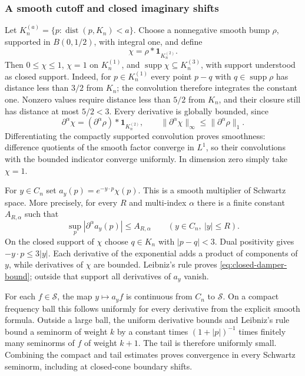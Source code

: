 \subsubsection{A smooth cutoff and closed imaginary shifts}
Let $K_n^{(a)}=\{p:\operatorname{dist}(p,K_n)<a\}$.
Choose a nonnegative smooth bump $\rho$, supported in $B(0,1/2)$,
with integral one, and define
\[
 \chi=\rho*\mathbf1_{K_n^{(2)}}.
\]
Then $0\leq\chi\leq1$, $\chi=1$ on $K_n^{(1)}$, and
$\operatorname{supp}\chi\subseteq K_n^{(3)}$, with support understood
as closed support. Indeed, for $p\in K_n^{(1)}$ every point $p-q$ with
$q\in\operatorname{supp}\rho$ has distance less than $3/2$ from $K_n$;
the convolution therefore integrates the constant one. Nonzero values
require distance less than $5/2$ from $K_n$, and their closure still has
distance at most $5/2<3$.
Every derivative is globally bounded, since
\[
 \partial^\alpha\chi=(\partial^\alpha\rho)*\mathbf1_{K_n^{(2)}},
 \qquad \|\partial^\alpha\chi\|_\infty
             \leq\|\partial^\alpha\rho\|_1.
\]
Differentiating the compactly supported convolution proves smoothness:
difference quotients of the smooth factor converge in $L^1$, so their
convolutions with the bounded indicator converge uniformly. In dimension
zero simply take $\chi=1$.

For $y\in C_n$ set $a_y(p)=e^{-y\cdot p}\chi(p)$.
This is a smooth multiplier of Schwartz space. More precisely, for every
$R$ and multi-index $\alpha$ there is a finite constant $A_{R,\alpha}$
such that
\begin{equation}\label{eq:closed-damper-bound}
 \sup_p|\partial^\alpha a_y(p)|\leq A_{R,\alpha}
       \qquad(y\in C_n,\ |y|\leq R).
\end{equation}
On the closed support of $\chi$ choose $q\in K_n$ with $|p-q|<3$.
Dual positivity gives $-y\cdot p\leq3|y|$. Each derivative of the
exponential adds a product of components of $y$, while derivatives of
$\chi$ are bounded. Leibniz's rule proves
\eqref{eq:closed-damper-bound}; outside that support all derivatives of
$a_y$ vanish.

For each $f\in\mathscr S$, the map $y\mapsto a_yf$ is continuous from
$C_n$ to $\mathscr S$. On a compact frequency ball this follows uniformly
for every derivative from the explicit smooth formula. Outside a large
ball, the uniform derivative bounds and Leibniz's rule bound a seminorm
of weight $k$ by a constant times $(1+|p|)^{-1}$ times finitely many
seminorms of $f$ of weight $k+1$. The tail is therefore uniformly small.
Combining the compact and tail estimates proves convergence in every
Schwartz seminorm, including at closed-cone boundary shifts.

